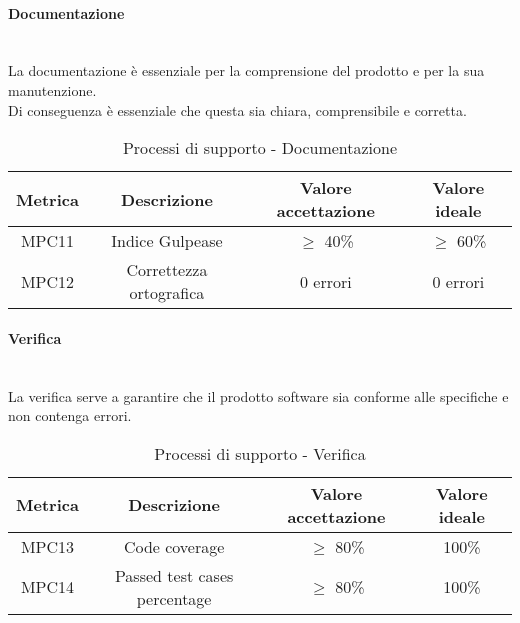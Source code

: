 \documentclass[10pt]{article}
\begin{document}
\begin{justify}
\paragraph{Documentazione}\mbox{}\\
La documentazione è essenziale per la comprensione del prodotto e per la sua manutenzione.\\
Di conseguenza è essenziale che questa sia chiara, comprensibile e corretta.\\
\begin{table}[H]
  \centering
\begin{tabular}{|c|c|c|c|}
  \hline
  \textbf{Metrica} & \textbf{Descrizione} & \textbf{Valore accettazione} & \textbf{Valore ideale}\\
  \hline
  MPC11 & Indice Gulpease & $\geq$ 40\% & $\geq$ 60\% \\
  \hline
  MPC12 & Correttezza ortografica & 0 errori & 0 errori \\
  \hline
\end{tabular}
\caption{Processi di supporto - Documentazione}
\label{tab:documentazione}
\end{table}

\paragraph{Verifica}\mbox{}\\
La verifica serve a garantire che il prodotto software sia conforme alle specifiche e non contenga errori.\\
\begin{table}[H]
  \centering
\begin{tabular}{|c|c|c|c|}
  \hline
  \textbf{Metrica} & \textbf{Descrizione} & \textbf{Valore accettazione} & \textbf{Valore ideale}\\
  \hline
  MPC13 & Code coverage & $\geq$ 80\% & 100\% \\
  \hline
  MPC14 & Passed test cases percentage & $\geq$ 80\% & 100\% \\
  \hline
\end{tabular}
\caption{Processi di supporto - Verifica}
\label{tab:verifica}
\end{table}


\end{justify}
\end{document}
